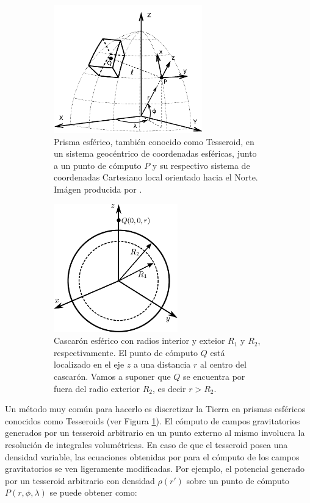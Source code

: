 \documentclass[a4paper,10pt]{article}
\begin{document}
\begin{figure}
    \begin{subfigure}[t]{0.5\textwidth}
    \centering
    \includegraphics[height=15em]{../manuscript/figures/tesseroid-uieda.pdf}
    \caption{
        Prisma esférico, también conocido como Tesseroid, en un sistema geocéntrico de coordenadas esféricas, junto a un punto de cómputo $P$ y su respectivo sistema de coordenadas Cartesiano local orientado hacia el Norte. Imágen producida por \citet{Uieda2015}.
    }
    \label{fig:tesseroid-uieda}
    \end{subfigure}
    \quad
    \begin{subfigure}[t]{0.5\textwidth}
    \centering
    \includegraphics[height=15em]{../manuscript/figures/spherical-shell.pdf}
    \caption{
        Cascarón esférico con radios interior y exteior $R_1$ y $R_2$, respectivamente. El punto de cómputo $Q$ está localizado en el eje $z$ a una distancia $r$ al centro del cascarón. Vamos a suponer que $Q$ se encuentra por fuera del radio exterior $R_2$, es decir $r > R_2$.
    }
    \label{fig:spherical-shell}
    \end{subfigure}
    \caption{}
\end{figure}

Un método muy común para hacerlo es discretizar la Tierra en prismas esféricos conocidos como Tesseroids (ver Figura \ref{fig:tesseroid-uieda}).
El cómputo de campos gravitatorios generados por un tesseroid arbitrario en un punto externo al mismo involucra la resolución de integrales volumétricas.
En caso de que el tesseroid posea una densidad variable, las ecuaciones obtenidas por \citet{Grombein2013} \citep[ver también][]{Uieda2016} para el cómputo de los campos gravitatorios se ven ligeramente modificadas. Por ejemplo, el potencial generado por un tesseroid arbitrario con densidad $\rho(r')$ sobre un punto de cómputo $P(r, \phi, \lambda)$ se puede obtener como:
\end{document}

